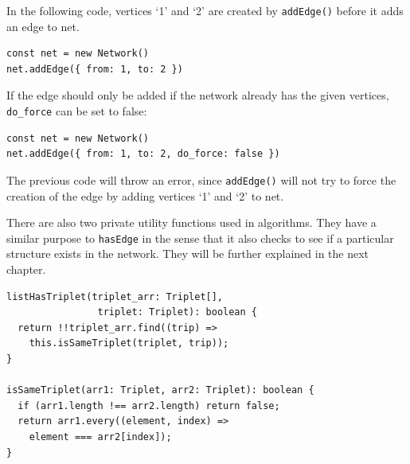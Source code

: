 In the following code, vertices `1' and `2' are created by \texttt{addEdge()}
before it adds an edge to net.

\begin{verbatim}
const net = new Network()
net.addEdge({ from: 1, to: 2 })
\end{verbatim}

If the edge should only be added if the network already has the given vertices,
\texttt{do_force} can be set to false:

\begin{verbatim}
const net = new Network()
net.addEdge({ from: 1, to: 2, do_force: false })
\end{verbatim}

The previous code will throw an error, since \texttt{addEdge()}
will not try to force the creation of the edge by
adding vertices `1' and `2' to net.

There are also two private utility functions used in algorithms.
They have a similar purpose to \texttt{hasEdge} in the sense
that it also checks to see if a particular structure exists in the network.
They will be further explained in the next chapter.

\begin{verbatim}
listHasTriplet(triplet_arr: Triplet[],
                triplet: Triplet): boolean {
  return !!triplet_arr.find((trip) =>
    this.isSameTriplet(triplet, trip));
}

isSameTriplet(arr1: Triplet, arr2: Triplet): boolean {
  if (arr1.length !== arr2.length) return false;
  return arr1.every((element, index) =>
    element === arr2[index]);
}
\end{verbatim}
